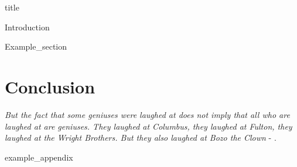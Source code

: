 \documentclass{article}
\begin{document}
{title}

\frontmatter

\tableofcontents

\listoffigures
\listoftables

\mainmatter

{Introduction}

{Example_section}

\section{Conclusion}
\textit{But the fact that some geniuses were laughed at does not imply that all who are laughed at are geniuses. They laughed at Columbus, they laughed at Fulton, they laughed at the Wright Brothers. But they also laughed at Bozo the Clown} -  \textcite{sagan_1993}.

\newpage
\printbibliography[heading = bibintoc, title = Bibliography]    %

\addappendix
{example_appendix}

\end{document}
